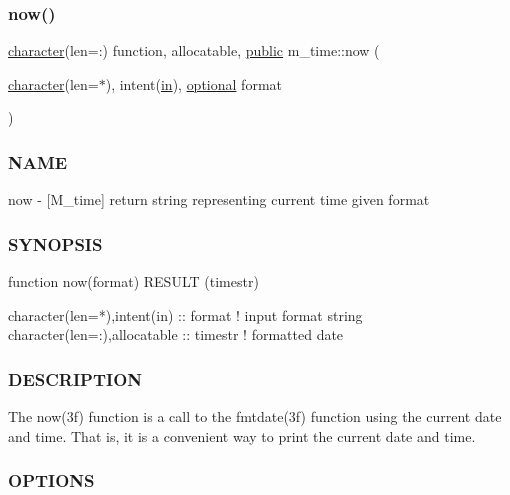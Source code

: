 \begin{DoxyVerb}
\subsubsection{\texorpdfstring{now()}{now()}}
{\footnotesize\ttfamily \hyperlink{option__stopwatch_83_8txt_abd4b21fbbd175834027b5224bfe97e66}{character}(len=\+:) function, allocatable, \hyperlink{M__stopwatch_83_8txt_a2f74811300c361e53b430611a7d1769f}{public} m\+\_\+time\+::now (\begin{DoxyParamCaption}\item[{\hyperlink{option__stopwatch_83_8txt_abd4b21fbbd175834027b5224bfe97e66}{character}(len=$\ast$), intent(\hyperlink{M__journal_83_8txt_afce72651d1eed785a2132bee863b2f38}{in}), \hyperlink{option__stopwatch_83_8txt_aa4ece75e7acf58a4843f70fe18c3ade5}{optional}}]{format }\end{DoxyParamCaption})}



\subsubsection*{N\+A\+ME}

now -\/ \mbox{[}M\+\_\+time\mbox{]} return string representing current time given format 

\subsubsection*{S\+Y\+N\+O\+P\+S\+IS}

\begin{DoxyVerb}function now(format) RESULT (timestr)

 character(len=*),intent(in)     :: format  ! input format string
 character(len=:),allocatable    :: timestr ! formatted date
\end{DoxyVerb}


\subsubsection*{D\+E\+S\+C\+R\+I\+P\+T\+I\+ON}

The now(3f) function is a call to the fmtdate(3f) function using the current date and time. That is, it is a convenient way to print the current date and time.

\subsubsection*{O\+P\+T\+I\+O\+NS}


\end{DoxyVerb}
